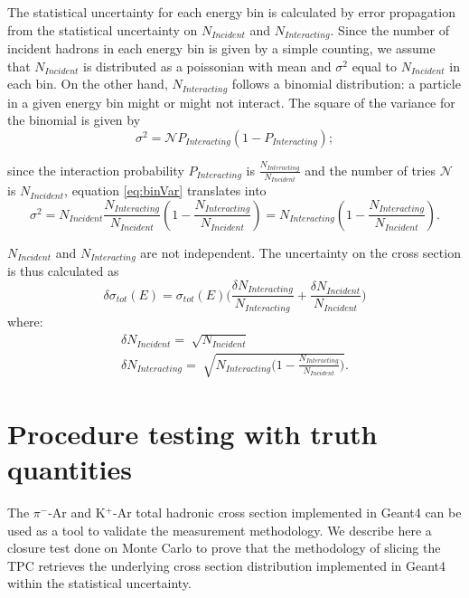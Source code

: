 The statistical uncertainty for each energy bin is calculated by error propagation from the statistical  uncertainty on $N_{Incident}$ and $N_{Interacting}$. 
Since the number of incident hadrons in each energy bin is given by a simple counting, we assume that $N_{Incident}$ is distributed as a poissonian with mean and $\sigma^2$ equal to $N_{Incident}$ in each bin.  
On the other hand, $N_{Interacting}$ follows a binomial distribution: a particle in a given energy bin might or might not interact.  The square of the variance for the binomial is given by  
\begin{equation}
\sigma^2 = \mathcal{N}P_{Interacting}(1-P_{Interacting});
\label{eq:binVar}
\end{equation}

since the interaction probability $P_{Interacting}$ is $\frac{ N_{Interacting}}{N_{Incident}}$ and the number of tries $\mathcal{N}$ is $N_{Incident}$, equation \ref{eq:binVar} translates into
\begin{equation}
\sigma^2 = N_{Incident}\frac{ N_{Interacting}}{N_{Incident}} (1-\frac{ N_{Interacting}}{N_{Incident}}) = N_{Interacting}(1-\frac{ N_{Interacting}}{N_{Incident}}).
\end{equation}

$N_{Incident}$ and $N_{Interacting}$ are not independent.
The uncertainty on the cross section is thus calculated as 
\begin{equation}
\delta\sigma_{tot}(E) = \sigma_{tot}(E) \Big(\frac{\delta N_{Interacting}}{N_{Interacting}}+\frac{\delta N_{Incident}}{N_{Incident}}\Big) 
\end{equation}
where:
\begin{eqnarray}
\delta N_{Incident} = \sqrt[]{N_{Incident}} \\
\delta N_{Interacting} = \sqrt[]{N_{Interacting}\Big(1-\frac{ N_{Interacting}}{N_{Incident}}\Big)}.
\end{eqnarray}





\section{Procedure testing with truth quantities}\label{ch:procedureTesting}
The $\pi^{-}$-Ar and K$^{+}$-Ar total hadronic cross section implemented in Geant4 can be used as a tool to validate the measurement methodology.  We describe here a closure test done on Monte Carlo to prove that the methodology of slicing the TPC retrieves the underlying cross section distribution implemented in Geant4 within the statistical uncertainty. %


